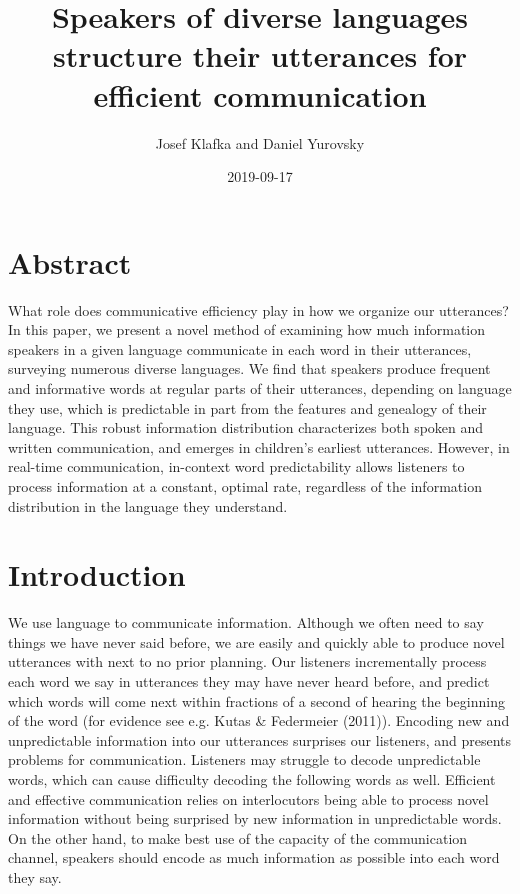\documentclass[11pt,]{article}
\title{Speakers of diverse languages structure their utterances for efficient communication}
\author{Josef Klafka and Daniel Yurovsky}
\date{2019-09-17}
\begin{document}
\maketitle

\hypertarget{abstract}{%
\section{Abstract}\label{abstract}}

What role does communicative efficiency play in how we organize our utterances? In this paper, we present a novel method of examining how much information speakers in a given language communicate in each word in their utterances, surveying numerous diverse languages. We find that speakers produce frequent and informative words at regular parts of their utterances, depending on language they use, which is predictable in part from the features and genealogy of their language. This robust information distribution characterizes both spoken and written communication, and emerges in children's earliest utterances. However, in real-time communication, in-context word predictability allows listeners to process information at a constant, optimal rate, regardless of the information distribution in the language they understand.

\hypertarget{introduction}{%
\section{Introduction}\label{introduction}}

We use language to communicate information. Although we often need to say things we have never said before, we are easily and quickly able to produce novel utterances with next to no prior planning. Our listeners incrementally process each word we say in utterances they may have never heard before, and predict which words will come next within fractions of a second of hearing the beginning of the word (for evidence see e.g. Kutas \& Federmeier (2011)). Encoding new and unpredictable information into our utterances surprises our listeners, and presents problems for communication. Listeners may struggle to decode unpredictable words, which can cause difficulty decoding the following words as well. Efficient and effective communication relies on interlocutors being able to process novel information without being surprised by new information in unpredictable words. On the other hand, to make best use of the capacity of the communication channel, speakers should encode as much information as possible into each word they say.
\end{document}
